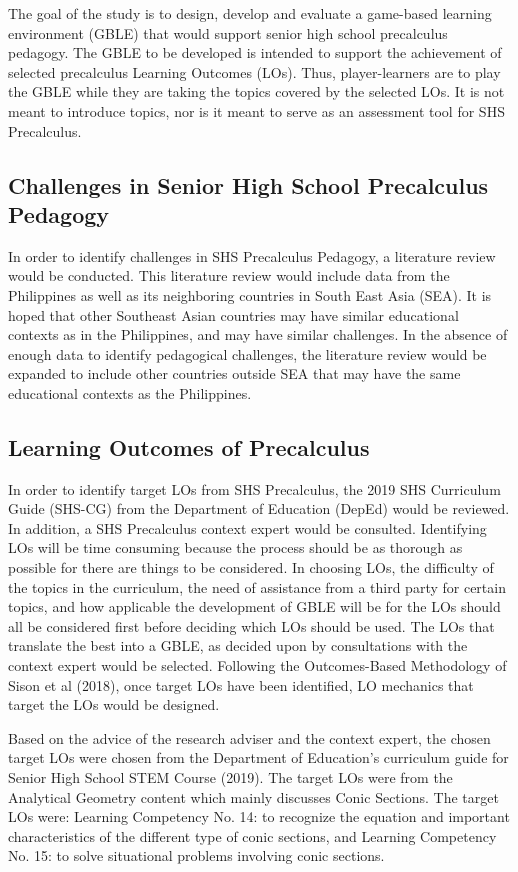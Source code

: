 The goal of the study is to design, develop and evaluate a game-based learning environment (GBLE) that  would support senior high school precalculus pedagogy. The GBLE to be developed is intended to support the achievement of selected precalculus Learning Outcomes (LOs). Thus, player-learners are to play the GBLE while they are taking the topics covered by the selected LOs. It is not meant to introduce topics, nor is it meant to serve as an assessment tool for SHS Precalculus.

\begin{subs}
\subsection{Challenges in Senior High School Precalculus Pedagogy}
In order to identify challenges in SHS Precalculus Pedagogy, a literature review would be conducted. This literature review would include data from the Philippines as well as its neighboring countries in South East Asia (SEA). It is hoped that other Southeast Asian countries may have similar educational contexts as in the Philippines, and may have similar challenges. In the absence of enough data to identify pedagogical challenges, the literature review would be expanded to include other countries outside SEA that may have the same educational contexts as the Philippines.

\subsection{Learning Outcomes of Precalculus}
In order to identify target LOs from SHS Precalculus, the 2019 SHS Curriculum Guide (SHS-CG) from the Department of Education (DepEd) would be reviewed. In addition, a SHS Precalculus context expert would be consulted. Identifying LOs will be time consuming because the process should be as thorough as possible for there are things to be considered. In choosing LOs, the difficulty of the topics in the curriculum, the need of assistance from a third party for certain topics, and how applicable the development of GBLE will be for the LOs should all be considered first before deciding which LOs should be used. The LOs that translate the best into a GBLE, as decided upon by consultations with the context expert would be selected. Following the Outcomes-Based Methodology of Sison et al (2018), once target LOs have been identified, LO mechanics that target the LOs would be designed.

Based on the advice of the research adviser and the context expert, the chosen target LOs were chosen from the Department of Education’s curriculum guide for Senior High School STEM Course (2019). The target LOs were from the Analytical Geometry content which mainly discusses Conic Sections. The target LOs were: Learning Competency No. 14: to recognize the equation and important characteristics of the different type of conic sections, and Learning Competency No. 15: to solve situational problems involving conic sections.


\end{subs}
